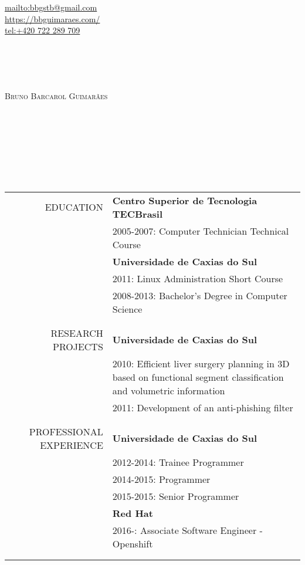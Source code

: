 \begin{flushright}
    \url{mailto:bbgstb@gmail.com} \\
    \url{https://bbguimaraes.com/} \\
    \url{tel:+420 722 289 709}
\end{flushright}
~\\\\\\\\
\textsc{\Huge Bruno Barcarol Guimarães}
\\\\\\\\\\\\\\\\
\begin{tabular}{rp{12cm}}
    \uppercase{Education}
    & \textbf{Centro Superior de Tecnologia TECBrasil} \\
    & 2005-2007: Computer Technician Technical Course \\
    & \textbf{Universidade de Caxias do Sul} \\
    & 2011: Linux Administration Short Course \\
    & 2008-2013: Bachelor's Degree in Computer Science
    \\\\ \hline \\
    \uppercase{Research projects}
    & \textbf{Universidade de Caxias do Sul} \\
    & 2010:
        Efficient liver surgery planning in 3D based on functional segment
        classification and volumetric information \\
    & 2011: Development of an anti-phishing filter
    \\\\ \hline \\
    \uppercase{Professional experience}
    & \textbf{Universidade de Caxias do Sul} \\
    & 2012-2014: Trainee Programmer \\
    & 2014-2015: Programmer \\
    & 2015-2015: Senior Programmer \\
    & \textbf{Red Hat} \\
    & 2016-: Associate Software Engineer - Openshift
    \\\\ \hline \\

\end{tabular}
